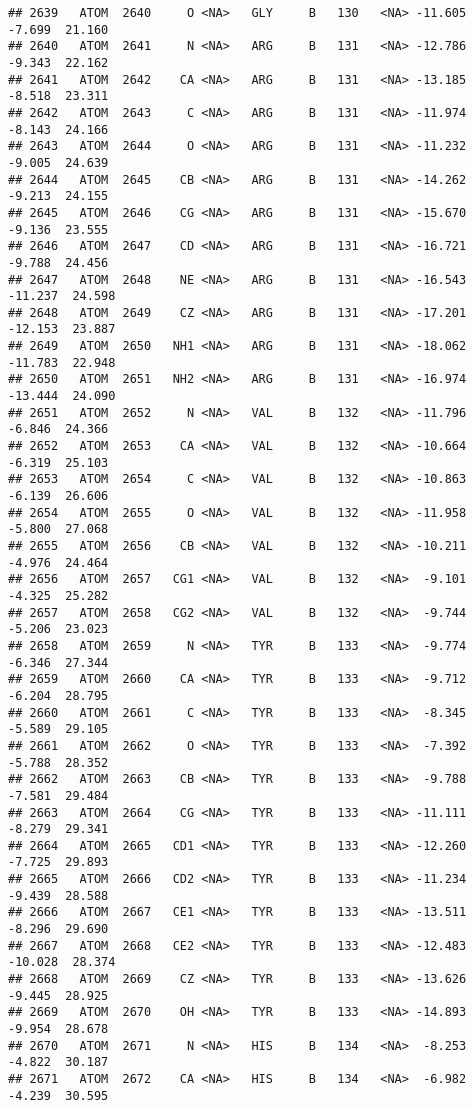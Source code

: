 \documentclass[
]{article}
\begin{document}
\begin{verbatim}
## 2639   ATOM  2640     O <NA>   GLY     B   130   <NA> -11.605  -7.699  21.160
## 2640   ATOM  2641     N <NA>   ARG     B   131   <NA> -12.786  -9.343  22.162
## 2641   ATOM  2642    CA <NA>   ARG     B   131   <NA> -13.185  -8.518  23.311
## 2642   ATOM  2643     C <NA>   ARG     B   131   <NA> -11.974  -8.143  24.166
## 2643   ATOM  2644     O <NA>   ARG     B   131   <NA> -11.232  -9.005  24.639
## 2644   ATOM  2645    CB <NA>   ARG     B   131   <NA> -14.262  -9.213  24.155
## 2645   ATOM  2646    CG <NA>   ARG     B   131   <NA> -15.670  -9.136  23.555
## 2646   ATOM  2647    CD <NA>   ARG     B   131   <NA> -16.721  -9.788  24.456
## 2647   ATOM  2648    NE <NA>   ARG     B   131   <NA> -16.543 -11.237  24.598
## 2648   ATOM  2649    CZ <NA>   ARG     B   131   <NA> -17.201 -12.153  23.887
## 2649   ATOM  2650   NH1 <NA>   ARG     B   131   <NA> -18.062 -11.783  22.948
## 2650   ATOM  2651   NH2 <NA>   ARG     B   131   <NA> -16.974 -13.444  24.090
## 2651   ATOM  2652     N <NA>   VAL     B   132   <NA> -11.796  -6.846  24.366
## 2652   ATOM  2653    CA <NA>   VAL     B   132   <NA> -10.664  -6.319  25.103
## 2653   ATOM  2654     C <NA>   VAL     B   132   <NA> -10.863  -6.139  26.606
## 2654   ATOM  2655     O <NA>   VAL     B   132   <NA> -11.958  -5.800  27.068
## 2655   ATOM  2656    CB <NA>   VAL     B   132   <NA> -10.211  -4.976  24.464
## 2656   ATOM  2657   CG1 <NA>   VAL     B   132   <NA>  -9.101  -4.325  25.282
## 2657   ATOM  2658   CG2 <NA>   VAL     B   132   <NA>  -9.744  -5.206  23.023
## 2658   ATOM  2659     N <NA>   TYR     B   133   <NA>  -9.774  -6.346  27.344
## 2659   ATOM  2660    CA <NA>   TYR     B   133   <NA>  -9.712  -6.204  28.795
## 2660   ATOM  2661     C <NA>   TYR     B   133   <NA>  -8.345  -5.589  29.105
## 2661   ATOM  2662     O <NA>   TYR     B   133   <NA>  -7.392  -5.788  28.352
## 2662   ATOM  2663    CB <NA>   TYR     B   133   <NA>  -9.788  -7.581  29.484
## 2663   ATOM  2664    CG <NA>   TYR     B   133   <NA> -11.111  -8.279  29.341
## 2664   ATOM  2665   CD1 <NA>   TYR     B   133   <NA> -12.260  -7.725  29.893
## 2665   ATOM  2666   CD2 <NA>   TYR     B   133   <NA> -11.234  -9.439  28.588
## 2666   ATOM  2667   CE1 <NA>   TYR     B   133   <NA> -13.511  -8.296  29.690
## 2667   ATOM  2668   CE2 <NA>   TYR     B   133   <NA> -12.483 -10.028  28.374
## 2668   ATOM  2669    CZ <NA>   TYR     B   133   <NA> -13.626  -9.445  28.925
## 2669   ATOM  2670    OH <NA>   TYR     B   133   <NA> -14.893  -9.954  28.678
## 2670   ATOM  2671     N <NA>   HIS     B   134   <NA>  -8.253  -4.822  30.187
## 2671   ATOM  2672    CA <NA>   HIS     B   134   <NA>  -6.982  -4.239  30.595

\end{verbatim}
\end{document}
